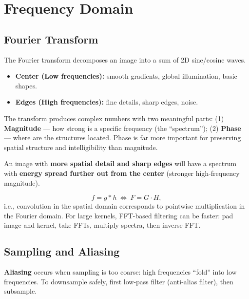 \documentclass[11pt, oneside]{book}
\begin{document}
\section{Frequency Domain}

\subsection{Fourier Transform}

\begin{defbox}[title={Fourier Decomposition}]
The Fourier transform decomposes an image into a sum of 2D sine/cosine waves.
\begin{itemize}
  \item \textbf{Center (Low frequencies):} smooth gradients, global illumination, basic shapes.
  \item \textbf{Edges (High frequencies):} fine details, sharp edges, noise.
\end{itemize}
\end{defbox}

The transform produces complex numbers with two meaningful parts:
(1) \textbf{Magnitude} --- how strong is a specific frequency (the ``spectrum'');
(2) \textbf{Phase} --- where are the structures located. Phase is far more important for preserving
spatial structure and intelligibility than magnitude.

An image with \textbf{more spatial detail and sharp edges} will have a spectrum with \textbf{energy spread further out from the center} (stronger high-frequency magnitude).

\begin{thmbox}[title={Convolution Theorem}]
\[
f = g*h\ \Longleftrightarrow\ F = G\cdot H,
\]
i.e., convolution in the spatial domain corresponds to pointwise multiplication in the Fourier domain.
For large kernels, FFT-based filtering can be faster: pad image and kernel, take FFTs, multiply spectra, then inverse FFT.
\end{thmbox}

\subsection{Sampling and Aliasing}

\begin{defbox}[title={Aliasing}]
\textbf{Aliasing} occurs when sampling is too coarse: high frequencies ``fold'' into low frequencies.
To downsample safely, first low-pass filter (anti-alias filter), then subsample.
\end{defbox}
\end{document}
